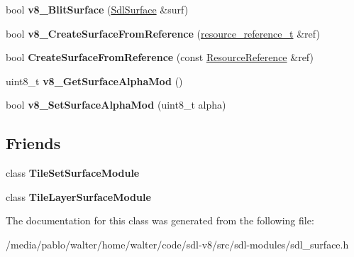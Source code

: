 \begin{DoxyCompactItemize}
bool {\bfseries v8\+\_\+\+Blit\+Surface} (\mbox{\hyperlink{classSdlSurface}{Sdl\+Surface}} \&surf)
\item 
\mbox{\label{classSdlSurface_a5a5cd7ef64ee0111e585b1da2ea10e56}} 
bool {\bfseries v8\+\_\+\+Create\+Surface\+From\+Reference} (\mbox{\hyperlink{classWrapPtr}{resource\+\_\+reference\+\_\+t}} \&ref)
\item 
\mbox{\label{classSdlSurface_a192414025e3731f3d0382a2debc985f8}} 
bool {\bfseries Create\+Surface\+From\+Reference} (const \mbox{\hyperlink{classResourceReference}{Resource\+Reference}} \&ref)
\item 
\mbox{\label{classSdlSurface_a59a8c679cd6bd36c2d0cc09fadeb4f24}} 
uint8\+\_\+t {\bfseries v8\+\_\+\+Get\+Surface\+Alpha\+Mod} ()
\item 
\mbox{\label{classSdlSurface_a6099ac1c921bc6aa110bd68071c64f07}} 
bool {\bfseries v8\+\_\+\+Set\+Surface\+Alpha\+Mod} (uint8\+\_\+t alpha)
\end{DoxyCompactItemize}
\subsection*{Friends}
\begin{DoxyCompactItemize}
\item 
\mbox{\label{classSdlSurface_a526ee0b7edf5683ec02f0070c2169374}} 
class {\bfseries Tile\+Set\+Surface\+Module}
\item 
\mbox{\label{classSdlSurface_a4ad423596edd9a5bbd9c0bad1258180d}} 
class {\bfseries Tile\+Layer\+Surface\+Module}
\end{DoxyCompactItemize}


The documentation for this class was generated from the following file\+:\begin{DoxyCompactItemize}
\item 
/media/pablo/walter/home/walter/code/sdl-\/v8/src/sdl-\/modules/sdl\+\_\+surface.\+h\end{DoxyCompactItemize}
